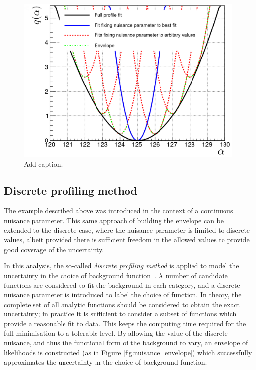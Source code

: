 \begin{figure}[hptb]
  \centering
  \includegraphics[width=.6\textwidth]{Figures/hgg_stats/nuisance_illustration.pdf}
  \caption[Constructing the envelope]
  {
    Add caption.
  }
  \label{fig:nuisance_illustration}
\end{figure}

\subsection{Discrete profiling method}
The example described above was introduced in the context of a continuous nuisance parameter. This same approach of building the envelope can be extended to the discrete case, where the nuisance parameter is limited to discrete values, albeit provided there is sufficient freedom in the allowed values to provide good coverage of the uncertainty.

In this analysis, the so-called \textit{discrete profiling method} is applied to model the uncertainty in the choice of background function~\cite{Dauncey:2014xga}. A number of candidate functions are considered to fit the background in each category, and a discrete nuisance parameter is introduced to label the choice of function. In theory, the complete set of all analytic functions should be considered to obtain the exact uncertainty; in practice it is sufficient to consider a subset of functions which provide a reasonable fit to data. This keeps the computing time required for the full minimisation to a tolerable level. By allowing the value of the discrete nuisance, and thus the functional form of the background to vary, an envelope of likelihoods is constructed (as in Figure \ref{fig:nuisance_envelope}) which successfully approximates the uncertainty in the choice of background function.

